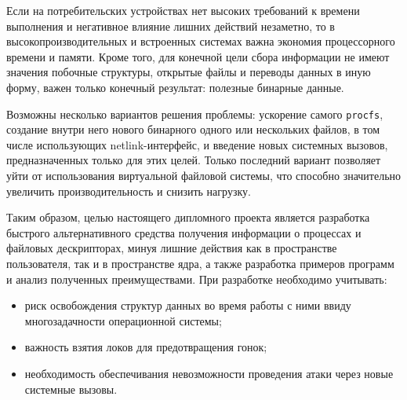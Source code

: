 Если на потребительских устройствах нет высоких требований к времени выполнения
и негативное влияние лишних действий незаметно, то в высокопроизводительных и
встроенных системах важна экономия процессорного времени и памяти. Кроме того,
для конечной цели сбора информации не имеют значения побочные структуры,
открытые файлы и переводы данных в иную форму, важен только конечный результат:
полезные бинарные данные.

Возможны несколько вариантов решения проблемы: ускорение самого \texttt{procfs},
создание внутри него нового бинарного одного или нескольких файлов, в том числе
использующих netlink-интерфейс, и введение новых системных вызовов,
предназначенных только для этих целей. Только последний вариант позволяет уйти
от использования виртуальной файловой системы, что способно значительно
увеличить производительность и снизить нагрузку.

Таким образом, целью настоящего дипломного проекта является разработка быстрого
альтернативного средства получения информации о процессах и файловых
дескрипторах, минуя лишние действия как в пространстве пользователя, так и в
пространстве ядра, а также разработка примеров программ и анализ полученных
преимуществами. При разработке необходимо учитывать:
\begin{itemize}
\item риск освобождения структур данных во время работы с ними ввиду
  многозадачности операционной системы;
\item важность взятия локов для предотвращения гонок;
\item необходимость обеспечивания невозможности проведения атаки через новые
  системные вызовы.
\end{itemize}
